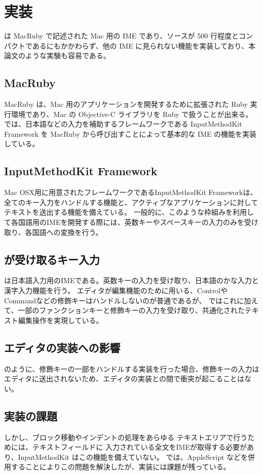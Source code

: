 \section{実装}
{\system} は MacRuby で記述された Mac 用の IME であり、ソースが 500 行程度とコンパクトであるにもかかわらず、他の IME に見られない機能を実装しており、本論文のような実験も容易である。

\subsection{MacRuby}
MacRuby は、Mac 用のアプリケーションを開発するために拡張された Ruby 実行環境であり、Mac の Objective-C ライブラリを Ruby で扱うことが出来る。
{\system} では、日本語などの入力を補助するフレームワークである InputMethodKit Framework を MacRuby から呼び出すことによって基本的な IME の機能を実装している。

\subsection{InputMethodKit Framework}
Mac OSX用に用意されたフレームワークであるInputMethodKit Frameworkは、全てのキー入力をハンドルする機能と、アクティブなアプリケーションに対してテキストを送出する機能を備えている。
一般的に、このような枠組みを利用して各国語用のIMEを開発する際には、英数キーやスペースキーの入力のみを受け取り、各国語への変換を行う。


\subsection{{\system}が受け取るキー入力}
{\system}は日本語入力用のIMEである。英数キーの入力を受け取り、日本語のかな入力と漢字入力機能を行う。
エディタが編集機能のために用いる、ControlやCommandなどの修飾キーはハンドルしないのが普通であるが、
{\system}ではこれに加えて、一部のファンクションキーと修飾キーの入力を受け取り、共通化されたテキスト編集操作を実現している。

\subsection{エディタの実装への影響}
{\system} のように、修飾キーの一部をハンドルする実装を行った場合、修飾キーの入力はエディタに送出されないため、エディタの実装との間で衝突が起こることはない。

\subsection{実装の課題}
しかし、ブロック移動やインデントの処理をあらゆる テキストエリアで行うためには、テキストフィールドに 入力されている全文をIMEが取得する必要があり、InputMethodKit はこの機能を備えていない。{\system} では、AppleScript などを併用することによりこの問題を解決したが、実装には課題が残っている。

